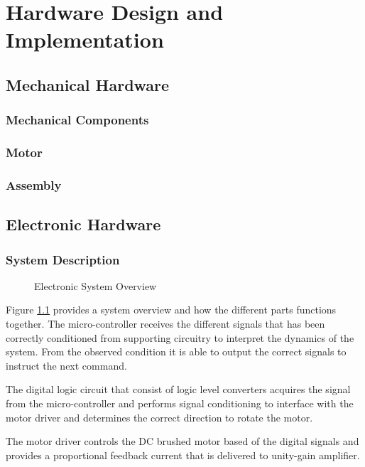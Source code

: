 \chapter{Hardware Design and Implementation}


\section{Mechanical Hardware}
\subsection{Mechanical Components}
\subsection{Motor}
\subsection{Assembly}



\section{Electronic Hardware}
\subsection{System Description}

\begin{figure}[h]
	\centering
	
	\caption{Electronic System Overview}
	\label{fig:electronicSystemOverview}
\end{figure}


Figure \ref{fig:electronicSystemOverview} provides a system overview and how the different parts functions together. The micro-controller receives the different signals that has been correctly conditioned from supporting circuitry to interpret the dynamics of the system. From the observed condition it is able to output the correct signals to instruct the next command.

The digital logic circuit that consist of logic level converters acquires the signal from the micro-controller and performs signal conditioning to interface with the motor driver and determines the correct direction to rotate the motor. 

The motor driver controls the DC brushed motor based of the digital signals and provides a proportional feedback current that is delivered to unity-gain amplifier.


